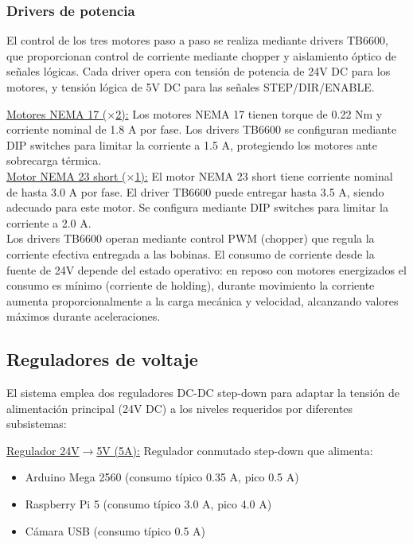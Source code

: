\subsubsection{Drivers de potencia}
El control de los tres motores paso a paso se realiza mediante drivers TB6600, que proporcionan control de corriente mediante chopper y aislamiento óptico de señales lógicas. Cada driver opera con tensión de potencia de 24V DC para los motores, y tensión lógica de 5V DC para las señales STEP/DIR/ENABLE.

\underline{Motores NEMA 17 ($\times$2):} Los motores NEMA 17 tienen torque de 0.22 Nm y corriente nominal de 1.8 A por fase. Los drivers TB6600 se configuran mediante DIP switches para limitar la corriente a 1.5 A, protegiendo los motores ante sobrecarga térmica.\\

\underline{Motor NEMA 23 short ($\times$1):} El motor NEMA 23 short tiene corriente nominal de hasta 3.0 A por fase. El driver TB6600 puede entregar hasta 3.5 A, siendo adecuado para este motor. Se configura mediante DIP switches para limitar la corriente a 2.0 A.\\

Los drivers TB6600 operan mediante control PWM (chopper) que regula la corriente efectiva entregada a las bobinas. El consumo de corriente desde la fuente de 24V depende del estado operativo: en reposo con motores energizados el consumo es mínimo (corriente de holding), durante movimiento la corriente aumenta proporcionalmente a la carga mecánica y velocidad, alcanzando valores máximos durante aceleraciones.

\subsection{Reguladores de voltaje}

El sistema emplea dos reguladores DC-DC step-down para adaptar la tensión de alimentación principal (24V DC) a los niveles requeridos por diferentes subsistemas:

\underline{Regulador 24V$\rightarrow$5V (5A):} Regulador conmutado step-down que alimenta:
\begin{itemize}[label=$\bullet$]
\item Arduino Mega 2560 (consumo típico 0.35 A, pico 0.5 A)
\item Raspberry Pi 5 (consumo típico 3.0 A, pico 4.0 A)
\item Cámara USB (consumo típico 0.5 A)
\end{itemize}

